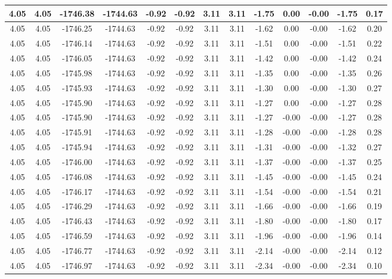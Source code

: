 \begin{table}[htbp]
\begin{adjustbox}{angle=90}
\begin{tabular}{|c|c|c|c|c|c|c|c|c|c|c|c|c|}
 4.05 & 4.05 & -1746.38 & -1744.63 & -0.92 & -0.92 & 3.11 & 3.11 & -1.75 & 0.00 & -0.00 & -1.75 & 0.17\\ \hline
 4.05 & 4.05 & -1746.25 & -1744.63 & -0.92 & -0.92 & 3.11 & 3.11 & -1.62 & 0.00 & -0.00 & -1.62 & 0.20\\ \hline
 4.05 & 4.05 & -1746.14 & -1744.63 & -0.92 & -0.92 & 3.11 & 3.11 & -1.51 & 0.00 & -0.00 & -1.51 & 0.22\\ \hline
 4.05 & 4.05 & -1746.05 & -1744.63 & -0.92 & -0.92 & 3.11 & 3.11 & -1.42 & 0.00 & -0.00 & -1.42 & 0.24\\ \hline
 4.05 & 4.05 & -1745.98 & -1744.63 & -0.92 & -0.92 & 3.11 & 3.11 & -1.35 & 0.00 & -0.00 & -1.35 & 0.26\\ \hline
 4.05 & 4.05 & -1745.93 & -1744.63 & -0.92 & -0.92 & 3.11 & 3.11 & -1.30 & 0.00 & -0.00 & -1.30 & 0.27\\ \hline
 4.05 & 4.05 & -1745.90 & -1744.63 & -0.92 & -0.92 & 3.11 & 3.11 & -1.27 & 0.00 & -0.00 & -1.27 & 0.28\\ \hline
 4.05 & 4.05 & -1745.90 & -1744.63 & -0.92 & -0.92 & 3.11 & 3.11 & -1.27 & -0.00 & -0.00 & -1.27 & 0.28\\ \hline
 4.05 & 4.05 & -1745.91 & -1744.63 & -0.92 & -0.92 & 3.11 & 3.11 & -1.28 & -0.00 & -0.00 & -1.28 & 0.28\\ \hline
 4.05 & 4.05 & -1745.94 & -1744.63 & -0.92 & -0.92 & 3.11 & 3.11 & -1.31 & -0.00 & -0.00 & -1.32 & 0.27\\ \hline
 4.05 & 4.05 & -1746.00 & -1744.63 & -0.92 & -0.92 & 3.11 & 3.11 & -1.37 & -0.00 & -0.00 & -1.37 & 0.25\\ \hline
 4.05 & 4.05 & -1746.08 & -1744.63 & -0.92 & -0.92 & 3.11 & 3.11 & -1.45 & -0.00 & -0.00 & -1.45 & 0.24\\ \hline
 4.05 & 4.05 & -1746.17 & -1744.63 & -0.92 & -0.92 & 3.11 & 3.11 & -1.54 & -0.00 & -0.00 & -1.54 & 0.21\\ \hline
 4.05 & 4.05 & -1746.29 & -1744.63 & -0.92 & -0.92 & 3.11 & 3.11 & -1.66 & -0.00 & -0.00 & -1.66 & 0.19\\ \hline
 4.05 & 4.05 & -1746.43 & -1744.63 & -0.92 & -0.92 & 3.11 & 3.11 & -1.80 & -0.00 & -0.00 & -1.80 & 0.17\\ \hline
 4.05 & 4.05 & -1746.59 & -1744.63 & -0.92 & -0.92 & 3.11 & 3.11 & -1.96 & -0.00 & -0.00 & -1.96 & 0.14\\ \hline
 4.05 & 4.05 & -1746.77 & -1744.63 & -0.92 & -0.92 & 3.11 & 3.11 & -2.14 & -0.00 & -0.00 & -2.14 & 0.12\\ \hline
 4.05 & 4.05 & -1746.97 & -1744.63 & -0.92 & -0.92 & 3.11 & 3.11 & -2.34 & -0.00 & -0.00 & -2.34 & 0.10\\ \hline

\end{tabular}
\end{adjustbox}
\end{table}
